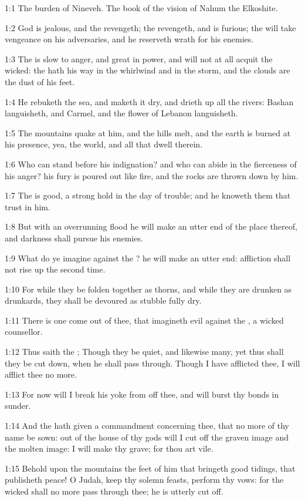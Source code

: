 

1:1 The burden of Nineveh. The book of the vision of Nahum the Elkoshite.

1:2 God is jealous, and the \LORD revengeth; the \LORD revengeth, and is
furious; the \LORD will take vengeance on his adversaries, and he
reserveth wrath for his enemies.

1:3 The \LORD is slow to anger, and great in power, and will not at all
acquit the wicked: the \LORD hath his way in the whirlwind and in the
storm, and the clouds are the dust of his feet.

1:4 He rebuketh the sea, and maketh it dry, and drieth up all the
rivers: Bashan languisheth, and Carmel, and the flower of Lebanon
languisheth.

1:5 The mountains quake at him, and the hills melt, and the earth is
burned at his presence, yea, the world, and all that dwell therein.

1:6 Who can stand before his indignation? and who can abide in the
fierceness of his anger? his fury is poured out like fire, and the
rocks are thrown down by him.

1:7 The \LORD is good, a strong hold in the day of trouble; and he
knoweth them that trust in him.

1:8 But with an overrunning flood he will make an utter end of the
place thereof, and darkness shall pursue his enemies.

1:9 What do ye imagine against the \LORD? he will make an utter end:
affliction shall not rise up the second time.

1:10 For while they be folden together as thorns, and while they are
drunken as drunkards, they shall be devoured as stubble fully dry.

1:11 There is one come out of thee, that imagineth evil against the
\LORD, a wicked counsellor.

1:12 Thus saith the \LORD; Though they be quiet, and likewise many, yet
thus shall they be cut down, when he shall pass through. Though I have
afflicted thee, I will afflict thee no more.

1:13 For now will I break his yoke from off thee, and will burst thy
bonds in sunder.

1:14 And the \LORD hath given a commandment concerning thee, that no
more of thy name be sown: out of the house of thy gods will I cut off
the graven image and the molten image: I will make thy grave; for thou
art vile.

1:15 Behold upon the mountains the feet of him that bringeth good
tidings, that publisheth peace! O Judah, keep thy solemn feasts,
perform thy vows: for the wicked shall no more pass through thee; he
is utterly cut off.

